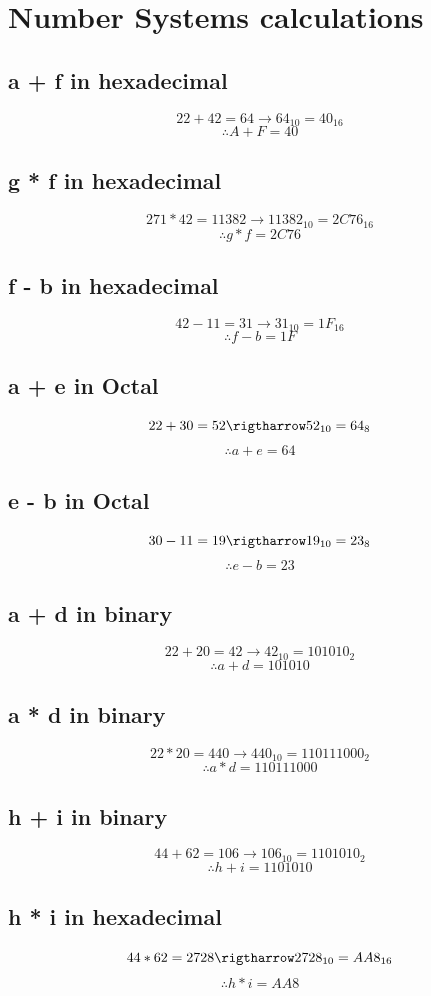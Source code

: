 \documentclass{article}
\begin{document}
\section{Number Systems calculations}
\subsection{a + f in hexadecimal}
\[
	22 + 42 = 64 \rightarrow 64_{10} = 40_{16}
\]
\[
	\therefore A+F = 40
\]
\subsection{g * f in hexadecimal}
\[
	271 * 42 = 11382 \rightarrow 11382_{10} = 2C76_{16}
\]
\[
	\therefore g * f = 2C76
\]
\subsection{f - b in hexadecimal}
\[
	42 - 11 = 31 \rightarrow  31_{10} = 1F_{16}
\]
\[
	\therefore f - b = 1F
\]
\subsection{a + e in Octal}
\[
	22 + 30 = 52 \rigtharrow 52_{10} = 64_{8}
\]
\[
	\therefore a + e = 64
\]
\subsection{e - b in Octal}
\[
	30 - 11 = 19 \rigtharrow 19_{10} = 23_{8}
\]
\[
	\therefore e - b = 23
\]
\subsection{a + d in binary}
\[
	22 + 20 = 42 \rightarrow 42_{10} = 101010_{2}
\]
\[
	\therefore a + d = 101010
\]
\subsection{a * d in binary}
\[
	22 * 20 = 440 \rightarrow 440_{10} = 110111000_{2}
\]
\[
	\therefore a * d = 110111000
\]
\subsection{h + i in binary}
\[
	44 + 62 = 106 \rightarrow 106_{10} = 1101010_{2}
\]
\[
	\therefore h + i = 1101010
\]
\subsection{h * i in hexadecimal}
\[
	44 * 62 = 2728 \rigtharrow 2728_{10} = AA8_{16}
\]
\[
	\therefore h * i = AA8
\]
\end{document}
